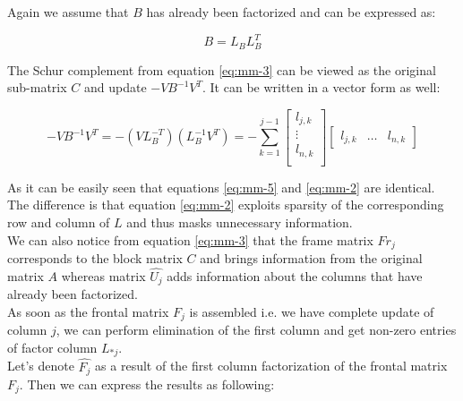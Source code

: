 Again we assume that $B$ has already been factorized and can be expressed as:

\begin{equation} \label{eq:mm-4}
	B = L_{B}L^{T}_{B}
\end{equation}

The Schur complement from equation \ref{eq:mm-3} can be viewed as the original sub-matrix $C$ and update $-VB^{-1}V^{T}$. It can be written in a vector form as well:

\begin{equation} \label{eq:mm-5}
	-VB^{-1}V^{T} = -(VL^{-T}_{B})(L^{-1}_{B}V^{T}) = - \sum_{k=1}^{j-1}  \begin{bmatrix}
l_{j,k} \\
\vdots \\
l_{n,k} \\
\end{bmatrix} \begin{bmatrix}
l_{j,k} & \dots & l_{n,k}
\end{bmatrix} 
\end{equation}

As it can be easily seen that equations \ref{eq:mm-5} and \ref{eq:mm-2} are identical. The difference is that equation \ref{eq:mm-2} exploits sparsity of the corresponding row and column of $L$ and thus masks unnecessary information. \\



We can also notice from equation \ref{eq:mm-3} that the frame matrix $Fr_{j}$ corresponds to the block matrix $C$ and brings information from the original matrix $A$ whereas matrix $\hat{U_{j}}$ adds information about the columns that have already been factorized.\\

As soon as the frontal matrix $F_{j}$ is assembled i.e. we have complete update of column $j$, we can perform elimination of the first column and get non-zero entries of factor column $L_{*j}$.\\

Let's denote $\hat{F_{j}}$ as a result of the first column factorization of the frontal matrix $F_{j}$. Then we can express the results as following:\\


